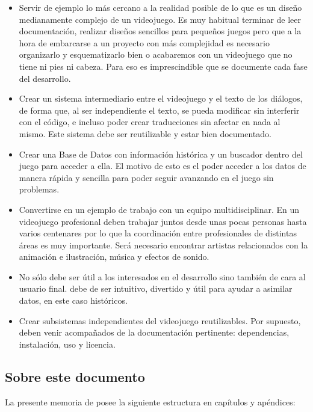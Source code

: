\begin{itemize}
\item Servir de ejemplo lo más cercano a la realidad posible de lo que es un diseño medianamente complejo de un videojuego. Es muy habitual terminar de leer documentación, realizar diseños sencillos para pequeños juegos pero que a la hora de embarcarse a un proyecto con más complejidad es necesario organizarlo y esquematizarlo bien o acabaremos con un videojuego que no tiene ni pies ni cabeza. Para eso es imprescindible que se documente cada fase del desarrollo.
\item Crear un sistema intermediario entre el videojuego y el texto de los diálogos, de forma que, al ser independiente el texto, se pueda modificar sin interferir con el código, e incluso poder crear traducciones sin afectar en nada al mismo. Este sistema debe ser reutilizable y estar bien documentado.
\item Crear una Base de Datos con información histórica y un buscador dentro del juego para acceder a ella. El motivo de esto es el poder acceder a los datos de manera rápida y sencilla para poder seguir avanzando en el juego sin problemas.
\item Convertirse en un ejemplo de trabajo con un equipo multidisciplinar. En un videojuego profesional deben trabajar juntos desde unas pocas personas hasta varios centenares por lo que la coordinación entre profesionales de distintas áreas es muy importante. Será necesario encontrar artistas relacionados con la animación e ilustración, música y efectos de sonido.
\item No sólo debe ser útil a los interesados en el desarrollo sino también de cara al usuario final. \nombrejuego debe de ser intuitivo, divertido y útil para ayudar a asimilar datos, en este caso históricos.
\item Crear subsistemas independientes del videojuego reutilizables. Por supuesto, deben venir acompañados de la documentación pertinente: dependencias, instalación, uso y licencia.
\end{itemize}

\subsection{Sobre este documento}
La presente memoria de  posee la siguiente estructura en capítulos y apéndices:

